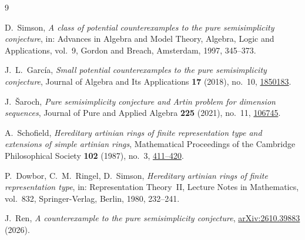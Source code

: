\documentclass[11pt,a4paper,reqno]{amsart}
\numberwithin{equation}{section}
\theoremstyle{remark}
\begin{document}
\begin{thebibliography}{9}

D.~Simson,
\emph{A class of potential counterexamples to the pure semisimplicity conjecture},
in: Advances in Algebra and Model Theory, Algebra, Logic and Applications,
vol.~9, Gordon and Breach, Amsterdam, 1997, 345--373.

J.~L.~Garc\'ia,
\emph{Small potential counterexamples to the pure semisimplicity conjecture},
Journal of Algebra and Its Applications \textbf{17} (2018), no.~10,
\href{https://doi.org/10.1142/S0219498818501839}{1850183}.

J.~\v{S}aroch,
\emph{Pure semisimplicity conjecture and Artin problem for dimension sequences},
Journal of Pure and Applied Algebra \textbf{225} (2021), no.~11,
\href{https://doi.org/10.1016/j.jpaa.2021.106745}{106745}.

A.~Schofield,
\emph{Hereditary artinian rings of finite representation type and extensions
of simple artinian rings},
Mathematical Proceedings of the Cambridge Philosophical Society
\textbf{102} (1987), no.~3, \href{https://doi.org/10.1017/S0305004100067463}{411--420}.

P.~Dowbor, C.~M.~Ringel, D.~Simson,
\emph{Hereditary artinian rings of finite representation type},
in: Representation Theory~II, Lecture Notes in Mathematics, vol.~832,
Springer-Verlag, Berlin, 1980, 232--241.

J.~Ren,
\emph{A counterexample to the pure semisimplicity conjecture},
\href{https://arxiv.org/abs/2610.39883}{arXiv:2610.39883} (2026).

\end{thebibliography}
\end{document}
